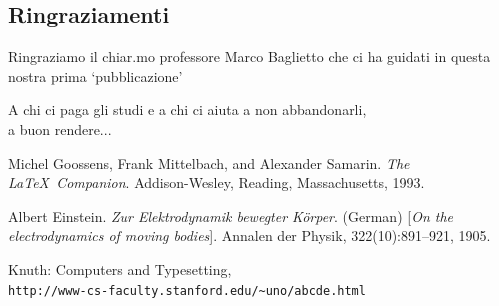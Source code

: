 \documentclass[a4paper,11pt,twoside]{book}
\makeatletter
\newenvironment{abstract}
{\cleardoublepage
	\thispagestyle{empty}
	\null \vfill
	\begin{center}
		\bfseries \abstractname 
	\end{center}}
{\vfill\null}
\renewcommand{\frontmatter}{%
	\cleardoublepage\@mainmatterfalse 
	\pagenumbering{smallRoman}}
\makeatother
\begin{document}
\vfill


\newpage\null\thispagestyle{empty}\newpage

\frontmatter
\thispagestyle{empty}
\null{}
\begin{center}
	\section*{Ringraziamenti}
		Ringraziamo il chiar.mo professore Marco Baglietto che ci ha guidati in questa nostra prima `pubblicazione'
\end{center}
\null
\newpage
\begin{flushright}
	\null{}
	A chi ci paga gli studi e a chi ci aiuta a non abbandonarli,\\ a buon rendere...
	\null
\end{flushright}
\begin{abstract}
	\begin{center}
		
	\end{center}
\end{abstract}

\tableofcontents
\listoffigures

\mainmatter







\begin{thebibliography}{9}

	Michel Goossens, Frank Mittelbach, and Alexander Samarin. 
	\textit{The \LaTeX\ Companion}. 
	Addison-Wesley, Reading, Massachusetts, 1993.
	
	Albert Einstein. 
	\textit{Zur Elektrodynamik bewegter K{\"o}rper}. (German) 
	[\textit{On the electrodynamics of moving bodies}]. 
	Annalen der Physik, 322(10):891–921, 1905.
	
	Knuth: Computers and Typesetting,
	\\\texttt{http://www-cs-faculty.stanford.edu/\~{}uno/abcde.html}
\end{thebibliography}
\end{document}
